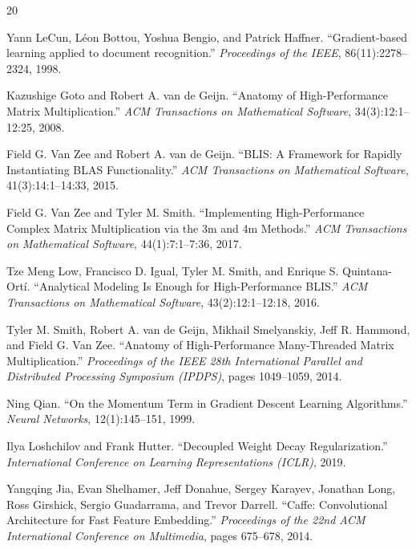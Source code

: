 \documentclass[a4paper,11pt,oneside]{article}
\begin{document}
\begin{thebibliography}{20}

Yann LeCun, Léon Bottou, Yoshua Bengio, and Patrick Haffner.
``Gradient-based learning applied to document recognition.''
\textit{Proceedings of the IEEE}, 86(11):2278--2324, 1998.

Kazushige Goto and Robert A. van de Geijn.
``Anatomy of High-Performance Matrix Multiplication.''
\textit{ACM Transactions on Mathematical Software}, 34(3):12:1--12:25, 2008.

Field G. Van Zee and Robert A. van de Geijn.
``BLIS: A Framework for Rapidly Instantiating BLAS Functionality.''
\textit{ACM Transactions on Mathematical Software}, 41(3):14:1--14:33, 2015.

Field G. Van Zee and Tyler M. Smith.
``Implementing High-Performance Complex Matrix Multiplication via the 3m and 4m Methods.''
\textit{ACM Transactions on Mathematical Software}, 44(1):7:1--7:36, 2017.

Tze Meng Low, Francisco D. Igual, Tyler M. Smith, and Enrique S. Quintana-Ort{\'i}.
``Analytical Modeling Is Enough for High-Performance BLIS.''
\textit{ACM Transactions on Mathematical Software}, 43(2):12:1--12:18, 2016.

Tyler M. Smith, Robert A. van de Geijn, Mikhail Smelyanskiy, Jeff R. Hammond, and Field G. Van Zee.
``Anatomy of High-Performance Many-Threaded Matrix Multiplication.''
\textit{Proceedings of the IEEE 28th International Parallel and Distributed Processing Symposium (IPDPS)}, pages 1049--1059, 2014.

Ning Qian.
``On the Momentum Term in Gradient Descent Learning Algorithms.''
\textit{Neural Networks}, 12(1):145--151, 1999.

Ilya Loshchilov and Frank Hutter.
``Decoupled Weight Decay Regularization.''
\textit{International Conference on Learning Representations (ICLR)}, 2019.

Yangqing Jia, Evan Shelhamer, Jeff Donahue, Sergey Karayev, Jonathan Long, Ross Girshick, Sergio Guadarrama, and Trevor Darrell.
``Caffe: Convolutional Architecture for Fast Feature Embedding.''
\textit{Proceedings of the 22nd ACM International Conference on Multimedia}, pages 675--678, 2014.


\end{thebibliography}
\end{document}
